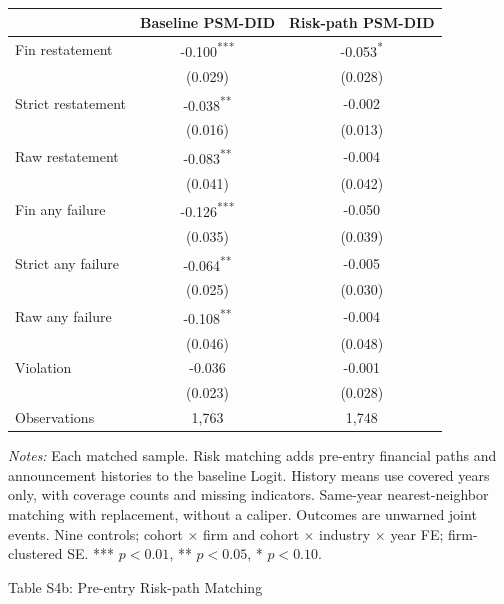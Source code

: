 \documentclass[10pt]{article}
\newcommand{\sym}[1]{\textsuperscript{#1}}
\begin{document}
\begin{tabular*}{\textwidth}{@{\extracolsep{\fill}}lcc@{}}
\toprule
 & Baseline PSM-DID & Risk-path PSM-DID \\
\midrule
Fin restatement & -0.100\sym{***} & -0.053\sym{*} \\
 & (0.029) & (0.028) \\
Strict restatement & -0.038\sym{**} & -0.002 \\
 & (0.016) & (0.013) \\
Raw restatement & -0.083\sym{**} & -0.004 \\
 & (0.041) & (0.042) \\
Fin any failure & -0.126\sym{***} & -0.050 \\
 & (0.035) & (0.039) \\
Strict any failure & -0.064\sym{**} & -0.005 \\
 & (0.025) & (0.030) \\
Raw any failure & -0.108\sym{**} & -0.004 \\
 & (0.046) & (0.048) \\
Violation & -0.036 & -0.001 \\
 & (0.023) & (0.028) \\
\midrule
Observations & 1,763 & 1,748 \\
\bottomrule\end{tabular*}
\medskip\par\fontsize{9}{11}\selectfont
\textit{Notes:} Each matched sample. Risk matching adds pre-entry financial paths and announcement histories to the baseline Logit. History means use covered years only, with coverage counts and missing indicators. Same-year nearest-neighbor matching with replacement, without a caliper. Outcomes are unwarned joint events. Nine controls; cohort $\times$ firm and cohort $\times$ industry $\times$ year FE; firm-clustered SE. *** $p<0.01$, ** $p<0.05$, * $p<0.10$.
\par\fontsize{10}{12}\selectfont
\clearpage
\begin{center}\large Table S4b: Pre-entry Risk-path Matching\end{center}
\end{document}
